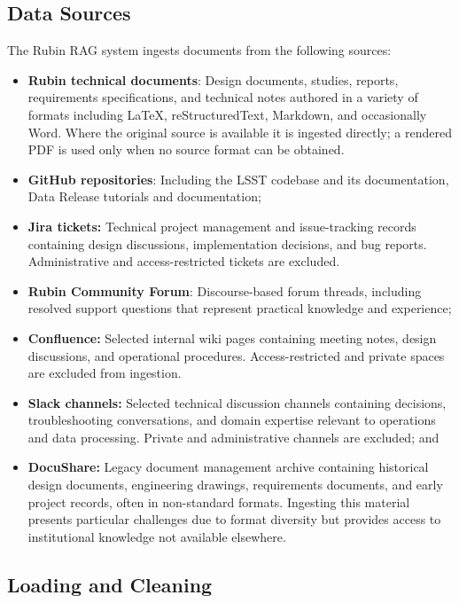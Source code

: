 \subsection{Data Sources}

The Rubin \gls{RAG} system ingests documents from the following sources:
\begin{itemize}
  \item \textbf{Rubin technical documents}: Design documents, studies, reports, requirements specifications, and technical notes authored in a variety of formats including \LaTeX{}, reStructuredText, Markdown, and occasionally Word. Where the original source is available it is ingested directly; a rendered PDF is used only when no source format can be obtained.
  \item \textbf{GitHub repositories}: Including the \gls{LSST} codebase and its documentation, Data Release tutorials and documentation;
 \item \textbf{Jira tickets:} Technical project management and issue-tracking records containing design discussions, implementation decisions, and bug reports. Administrative and access-restricted tickets are excluded.  \item \textbf{Rubin Community Forum}: Discourse-based forum threads, including resolved support questions that represent practical knowledge and experience;
 \item \textbf{Confluence:} Selected internal wiki pages containing meeting notes, design discussions, and operational procedures. Access-restricted and private spaces are excluded from ingestion.
  \item \textbf{Slack channels:} Selected technical discussion channels containing decisions, troubleshooting conversations, and domain expertise relevant to operations and data processing. Private and administrative channels are excluded; and
 \item \textbf{DocuShare:} Legacy document management archive containing historical design documents, engineering drawings, requirements documents, and early project records, often in non-standard formats. Ingesting this material presents particular challenges due to format diversity but provides access to institutional knowledge not available elsewhere.
\end{itemize}

\subsection{Loading and Cleaning}

